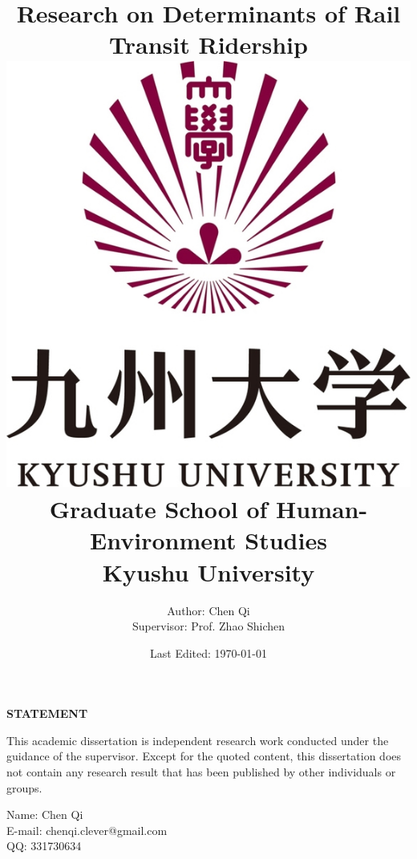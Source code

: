 \documentclass[12pt, twoside, a4paper]{book} %
\renewcommand{\baselinestretch}{1.5} %
\begin{document}
\title{
	{\Huge Research on Determinants of Rail Transit Ridership}\\
	{\vspace{3cm}}
	{\includegraphics[width=0.2\linewidth]{university.jpg}}\\
	{\vspace{2cm}}
	{\large Graduate School of Human-Environment Studies}\\
	{\large Kyushu University}
}
\author{
	{\large Author: Chen Qi}\\
	{\large Supervisor: Prof. Zhao Shichen}
	{\vspace{1cm}}
}
\date{\normalsize Last Edited: \today}
\maketitle

\centerline{\textbf{\Large STATEMENT}}
%
This academic dissertation is independent research work conducted under the guidance of the supervisor. Except for the quoted content, this dissertation does not contain any research result that has been published by other individuals or groups.\\
\newline
\newline
%
%

\begin{flushright}
	Name: Chen Qi \\
	E-mail: chenqi.clever@gmail.com \\
	QQ: 331730634 \\
\end{flushright}

\renewcommand{\baselinestretch}{1.0} %
\fontsize{14pt}{14pt} %
\selectfont

\tableofcontents %
\listoffigures %
\listoftables %

\frontmatter
\end{document}
